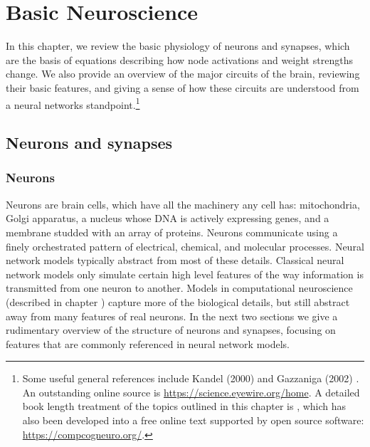 \chapter{Basic Neuroscience}\label{ch_neuro}


In this chapter, we review the basic physiology of neurons and synapses, which are the basis of equations describing how node activations and weight strengths change. We also provide an overview of the major circuits of the brain, reviewing their basic features, and giving a sense of how these circuits are understood from a neural networks standpoint.\footnote{Some useful general references include Kandel (2000) \cite{kandel2000principles} and Gazzaniga (2002) \cite{gazzaniga2002cognitive}. An outstanding online source is \url{https://science.eyewire.org/home}. A detailed book length treatment of the topics outlined in this chapter is \cite{cecn_4e}, which has also been developed into a free online text supported by open source software: \url{https://compcogneuro.org/}.}  

\section{Neurons and synapses}\label{neuronsSynapses}

\subsection{Neurons}

Neurons are brain cells, which have all the machinery any cell has: mitochondria, Golgi apparatus, a nucleus whose DNA is actively expressing genes, and a membrane studded with an array of proteins. Neurons communicate using a finely orchestrated pattern of electrical, chemical, and molecular processes. Neural network models typically abstract from most of these details. Classical neural network models only simulate certain high level features of the way information is transmitted from one neuron to another. Models in computational neuroscience (described in chapter ) capture more of the biological details, but still abstract away from many features of real neurons. In the next two sections we give a rudimentary overview of the structure of neurons and synapses, focusing on features that are commonly referenced in neural network models.

